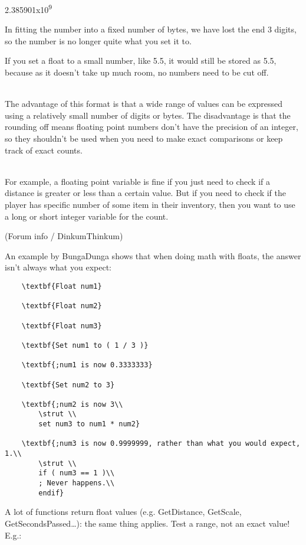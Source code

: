 2.385901x10\textsuperscript{9}

In fitting the number into a fixed number of bytes, we have lost the end
3 digits, so the number is no longer quite what you set it to.

If you set a float to a small number, like 5.5, it would still be stored
as 5.5, because as it doesn't take up much room, no numbers need to be
cut off.\\
\strut \\
The advantage of this format is that a wide range of values can be
expressed using a relatively small number of digits or bytes. The
disadvantage is that the rounding off means floating point numbers don't
have the precision of an integer, so they shouldn't be used when you
need to make exact comparisons or keep track of exact counts.\\
\strut \\
For example, a floating point variable is fine if you just need to check
if a distance is greater or less than a certain value. But if you need
to check if the player has specific number of some item in their
inventory, then you want to use a long or short integer variable for the
count.

(Forum info / DinkumThinkum)

An example by BungaDunga shows that when doing math with floats, the
answer isn't always what you expect:

\begin{lstlisting}
	\textbf{Float num1}
	
	\textbf{Float num2}
	
	\textbf{Float num3}
	
	\textbf{Set num1 to ( 1 / 3 )}
	
	\textbf{;num1 is now 0.3333333}
	
	\textbf{Set num2 to 3}
	
	\textbf{;num2 is now 3\\
		\strut \\
		set num3 to num1 * num2}
	
	\textbf{;num3 is now 0.9999999, rather than what you would expect, 1.\\
		\strut \\
		if ( num3 == 1 )\\
		; Never happens.\\
		endif}
\end{lstlisting}

A lot of functions return float values (e.g. GetDistance, GetScale,
GetSecondsPassed\ldots): the same thing applies. Test a range, not an
exact value! E.g.:

